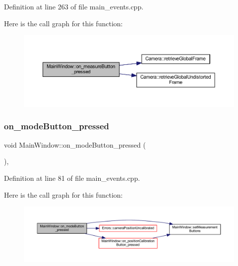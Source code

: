 Definition at line 263 of file main\+\_\+events.\+cpp.

Here is the call graph for this function\+:
\nopagebreak
\begin{figure}[H]
\begin{center}
\leavevmode
\includegraphics[width=350pt]{class_main_window_aa9bd65042eb23d5fa3f548da285067a6_cgraph}
\end{center}
\end{figure}
\mbox{\label{class_main_window_a295d30310cac58053dd2218f04a525c8}} 
\subsubsection{\texorpdfstring{on\_modeButton\_pressed}{on\_modeButton\_pressed}}
{\footnotesize\ttfamily void Main\+Window\+::on\+\_\+mode\+Button\+\_\+pressed (\begin{DoxyParamCaption}{ }\end{DoxyParamCaption})\hspace{0.3cm}{\ttfamily [private]}, {\ttfamily [slot]}}



Definition at line 81 of file main\+\_\+events.\+cpp.

Here is the call graph for this function\+:
\nopagebreak
\begin{figure}[H]
\begin{center}
\leavevmode
\includegraphics[width=350pt]{class_main_window_a295d30310cac58053dd2218f04a525c8_cgraph}
\end{center}
\end{figure}
\mbox{\label{class_main_window_ad8b394c839532c8b74fb8c7602d3da89}} 
